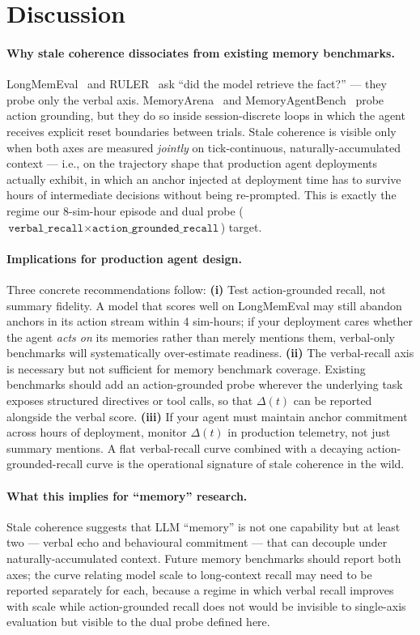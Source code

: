 \section{Discussion}
\label{sec:discussion}

\paragraph{Why stale coherence dissociates from existing memory
benchmarks.}
LongMemEval~\citep{Wu2025LongMemEval} and RULER~\citep{Hsieh2024RULER}
ask ``did the model retrieve the fact?'' --- they probe only the
verbal axis. MemoryArena~\citep{He2026MemoryArena} and
MemoryAgentBench~\citep{Hu2025MemoryAgentBench} probe action
grounding, but they do so inside session-discrete loops in which
the agent receives explicit reset boundaries between trials. Stale
coherence is visible only when both axes are measured \emph{jointly}
on tick-continuous, naturally-accumulated context --- i.e., on the
trajectory shape that production agent deployments actually exhibit,
in which an anchor injected at deployment time has to survive hours
of intermediate decisions without being re-prompted. This is
exactly the regime our 8-sim-hour episode and dual probe
($\texttt{verbal\_recall} \times \texttt{action\_grounded\_recall}$)
target.

\paragraph{Implications for production agent design.}
Three concrete recommendations follow:
\textbf{(i)} Test action-grounded recall, not summary fidelity. A
model that scores well on LongMemEval may still abandon anchors in
its action stream within 4 sim-hours; if your deployment cares
whether the agent \emph{acts on} its memories rather than merely
mentions them, verbal-only benchmarks will systematically
over-estimate readiness.
\textbf{(ii)} The verbal-recall axis is necessary but not
sufficient for memory benchmark coverage. Existing benchmarks
should add an action-grounded probe wherever the underlying task
exposes structured directives or tool calls, so that
$\Delta(t)$ can be reported alongside the verbal score.
\textbf{(iii)} If your agent must maintain anchor commitment across
hours of deployment, monitor $\Delta(t)$ in production telemetry,
not just summary mentions. A flat verbal-recall curve combined
with a decaying action-grounded-recall curve is the operational
signature of stale coherence in the wild.

\paragraph{What this implies for ``memory'' research.}
Stale coherence suggests that LLM ``memory'' is not one capability
but at least two --- verbal echo and behavioural commitment ---
that can decouple under naturally-accumulated context. Future memory
benchmarks should report both axes; the
\citet{Sinha2025IllusionDiminishingReturns} curve relating model
scale to long-context recall may need to be reported separately
for each, because a regime in which verbal recall improves with
scale while action-grounded recall does not would be invisible to
single-axis evaluation but visible to the dual probe defined here.
